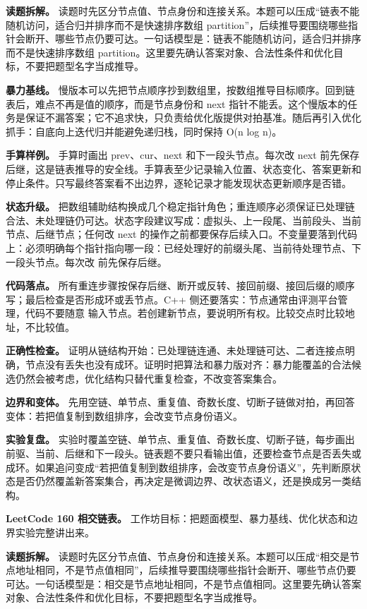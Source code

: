 \textbf{读题拆解。} 读题时先区分节点值、节点身份和连接关系。本题可以压成“链表不能随机访问，适合归并排序而不是快速排序数组 partition”，后续推导要围绕哪些指针会断开、哪些节点仍要可达。一句话模型是：链表不能随机访问，适合归并排序而不是快速排序数组 partition。这里要先确认答案对象、合法性条件和优化目标，不要把题型名字当成推导。

\textbf{暴力基线。} 慢版本可以先把节点顺序抄到数组里，按数组推导目标顺序。回到链表后，难点不再是值的顺序，而是节点身份和 next 指针不能丢。这个慢版本的任务是保证不漏答案；它不追求快，只负责给优化版提供对拍基准。随后再引入优化抓手：自底向上迭代归并能避免递归栈，同时保持 O(n log n)。

\textbf{手算样例。} 手算时画出 prev、cur、next 和下一段头节点。每次改 next 前先保存后继，这是链表推导的安全线。手算表至少记录输入位置、状态变化、答案更新和停止条件。只写最终答案看不出边界，逐轮记录才能发现状态更新顺序是否错。

\textbf{状态升级。} 把数组辅助结构换成几个稳定指针角色；重连顺序必须保证已处理链合法、未处理链仍可达。状态字段建议写成：虚拟头、上一段尾、当前段头、当前节点、后继节点；任何改 next 的操作之前都要保存后续入口。不变量要落到代码上：必须明确每个指针指向哪一段：已经处理好的前缀头尾、当前待处理节点、下一段头节点。每次改  前先保存后继。

\textbf{代码落点。} 所有重连步骤按保存后继、断开或反转、接回前缀、接回后缀的顺序写；最后检查是否形成环或丢节点。C++ 侧还要落实：节点通常由评测平台管理，代码不要随意  输入节点。若创建新节点，要说明所有权。比较交点时比较地址，不比较值。

\textbf{正确性检查。} 证明从链结构开始：已处理链连通、未处理链可达、二者连接点明确，节点没有丢失也没有成环。证明时把算法和暴力版对齐：暴力能覆盖的合法候选仍然会被考虑，优化结构只替代重复检查，不改变答案集合。

\textbf{边界和变体。} 先用空链、单节点、重复值、奇数长度、切断子链做对拍，再回答变体：若把值复制到数组排序，会改变节点身份语义。

\textbf{实验复盘。} 实验时覆盖空链、单节点、重复值、奇数长度、切断子链，每步画出前驱、当前、后继和下一段头。链表题不要只看输出值，还要检查节点是否丢失或成环。如果追问变成“若把值复制到数组排序，会改变节点身份语义”，先判断原状态是否仍然覆盖新答案集合，再决定是微调边界、改状态语义，还是换成另一类结构。

\noindent\textbf{LeetCode 160 相交链表。} 工作坊目标：把题面模型、暴力基线、优化状态和边界实验完整讲出来。

\textbf{读题拆解。} 读题时先区分节点值、节点身份和连接关系。本题可以压成“相交是节点地址相同，不是节点值相同”，后续推导要围绕哪些指针会断开、哪些节点仍要可达。一句话模型是：相交是节点地址相同，不是节点值相同。这里要先确认答案对象、合法性条件和优化目标，不要把题型名字当成推导。

